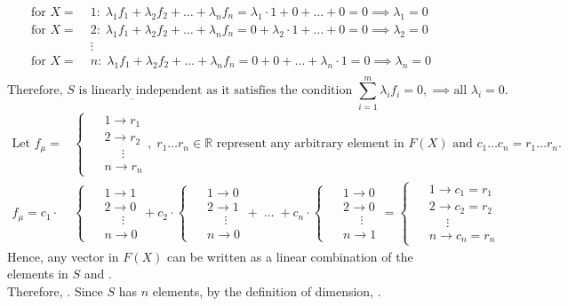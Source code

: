 \documentclass[10pt]{article}
\begin{document}
{{{\begin{center}
    \begin{align*}
    \text{for }X=\;&1:\;\lambda_1f_1+\lambda_2f_2+\dots+\lambda_nf_n=\lambda_1\cdot1+0+\dots+0=0\implies\lambda_1=0\\ 
    \text{for }X=\;&2:\;\lambda_1f_1+\lambda_2f_2+\dots+\lambda_nf_n=0+\lambda_2\cdot1+\dots+0=0\implies\lambda_2=0\\ 
    &\vdots\\
    \text{for }X=\;&n:\;\lambda_1f_1+\lambda_2f_2+\dots+\lambda_nf_n=0+0+\dots+\lambda_n\cdot1=0\implies\lambda_n=0\\ 
    \end{align*}
    $$\text{Therefore, }\underbar{S\text{ is linearly independent}}\text{ as it satisfies the condition }\sum_{i=1}^m\lambda_if_i=0,\implies\text{all }\lambda_i=0.
    $$
    \begin{align*}
        \text{Let }f_\mu=&\begin{cases} \phantom{-} 1\to r_1\\ \phantom{-}  2\to r_2 \\ \phantom{-} \;\;\;\;\;\vdots\\ \phantom{-} n\to r_n \end{cases},\;r_1\dots r_n\in\mathbb{R}
    \text{ represent any arbitrary element in }F(X)\text{ and }c_1\dots c_n=r_1\dots r_n.\\
        f_\mu=c_1\cdot
    &\begin{cases} \phantom{-} 1\to 1\\ \phantom{-}  2\to 0 \\ \phantom{-} \;\;\;\;\;\vdots\\ \phantom{-} n\to 0 \end{cases}+c_2\cdot
    \begin{cases} \phantom{-} 1\to 0\\ \phantom{-}  2\to 1 \\ \phantom{-} \;\;\;\;\;\vdots\\ \phantom{-} n\to 0 \end{cases}+\;\dots\;+c_n\cdot
    \begin{cases} \phantom{-} 1\to 0\\ \phantom{-}  2\to 0 \\ \phantom{-} \;\;\;\;\;\vdots\\ \phantom{-} n\to 1 \end{cases}=
    \begin{cases} \phantom{-} 1\to c_1=r_1\\ \phantom{-}  2\to c_2=r_2 \\ \phantom{-} \;\;\;\;\;\vdots\\ \phantom{-} n\to c_n=r_n \end{cases}
    \end{align*}
    Hence, any vector in $F(X)$ can be written as a linear combination of the elements in $S$ and .
    $$\;$$
    Therefore, . Since $S$ has $n$ elements, by the definition of dimension, .
    \end{center}

}}}
\end{document}
